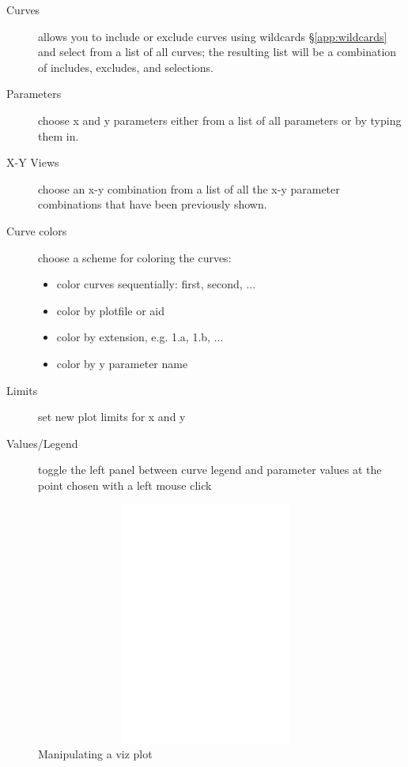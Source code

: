 \documentclass[11pt,openany,twoside]{book}
\numberwithin{equation}{section}		%
\newcommand{\Cmd}[1]{{\sf #1}}
\newcommand{\Sectref}[1]{\S\ref{#1}}
\newcommand{\Figref}[1]{Fig. \ref{#1}}  %
\begin{document}
\begin{description}
	\item[Curves] allows you to include or exclude curves using wildcards
		\Sectref{app:wildcards}
		and select from a list of all curves; the resulting list will be a
		combination of includes, excludes, and selections.
	\item[Parameters] choose x and y parameters either from a list of all
		parameters or by typing them in.
	\item[X-Y Views] choose an x-y combination from a list of all the x-y parameter
		combinations that have been previously shown.
	\item[Curve colors] choose a scheme for coloring the curves:
		\begin{itemize}
			\item color curves sequentially: first, second, ...
			\item color by plotfile or aid
			\item color by extension, e.g. 1.a, 1.b, ...
			\item color by y parameter name
		\end{itemize}
	\item[Limits] set new plot limits for x and y
	\item[Values/Legend] toggle the left panel between curve legend and parameter values
		at the point chosen with a left mouse click
\end{description}
\begin{figure}[ht] 	%
		\includegraphics[height=8cm,width=15cm]{viz-manip.eps}
	\centering
	\caption{Manipulating a \Cmd{viz} plot}\label{fig:viz-manip}
\end{figure}

\end{document}
